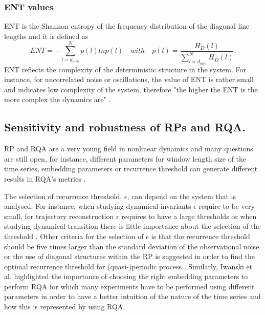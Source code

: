 \documentclass[fleqn,10pt]{wlscirep}
\begin{document}
\subsubsection*{ENT values}
ENT is the Shannon entropy of the frequency distribution of the diagonal line lengths and it is defined as
\begin{equation}
ENT= - \sum^{N}_{l=d_{min}} p(l) ln p(l) \quad with 
	\quad p(l)=\frac{ H_D(l) }{ \sum^{N}_{ l=d_{min} } H_D(l) }.
\end{equation}
ENT reflects the complexity of the deterministic structure in the system.
For instance, for uncorrelated noise or oscillations, the value of ENT is rather small and indicates low complexity of the system, therefore "the higher the ENT is the more complex the dynamics are" \cite{marwan2007, marwan2015}.
%
%

 
\subsection*{Sensitivity and robustness of RPs and RQA.}
RP and RQA are a very young field in nonlinear dynamics and many questions are still open, for instance, different parameters for window length size of the time series, embedding parameters or recurrence threshold can generate different results in RQA's metrics \cite{marwan2011, eckmann1987}.

The selection of recurrence threshold, $\epsilon$, can depend on the system that is analysed. For instance, when studying dynamical invariants $\epsilon$ require to be very small, for trajectory reconstruction $\epsilon$ requires to have a large thresholds or when studying dynamical transition there is little importance about the selection of the threshold \cite{marwan2011}.
Other criteria for the selection of $\epsilon$ is that the recurrence threshold  should be five times larger than the standard deviation of the observational noise or the use of diagonal structures within the RP is suggested in order to find the optimal recurrence threshold for (quasi-)periodic process \cite{marwan2011}.
Similarly, Iwanski et al. \cite{iwanski1998} highlighted the importance of choosing the right embedding parameters to perform RQA for which many experiments have to be performed using different parameters in order to have a better intuition of the nature of the time series and how this is represented by using RQA.
\end{document}
